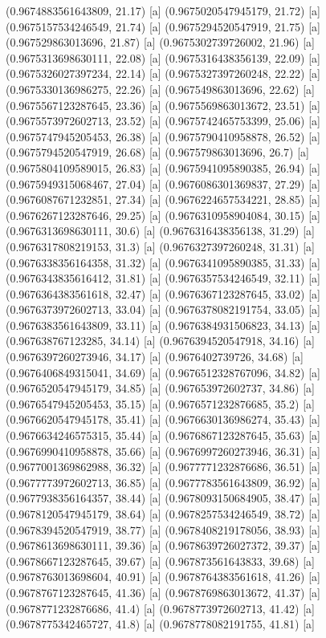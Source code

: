 {{{(0.9674883561643809, 21.17) [a] 
(0.9675020547945179, 21.72) [a] 
(0.9675157534246549, 21.74) [a] 
(0.9675294520547919, 21.75) [a] 
(0.967529863013696, 21.87) [a] 
(0.9675302739726002, 21.96) [a] 
(0.9675313698630111, 22.08) [a] 
(0.9675316438356139, 22.09) [a] 
(0.9675326027397234, 22.14) [a] 
(0.9675327397260248, 22.22) [a] 
(0.9675330136986275, 22.26) [a] 
(0.967549863013696, 22.62) [a] 
(0.9675567123287645, 23.36) [a] 
(0.9675569863013672, 23.51) [a] 
(0.9675573972602713, 23.52) [a] 
(0.9675742465753399, 25.06) [a] 
(0.9675747945205453, 26.38) [a] 
(0.9675790410958878, 26.52) [a] 
(0.9675794520547919, 26.68) [a] 
(0.967579863013696, 26.7) [a] 
(0.9675804109589015, 26.83) [a] 
(0.9675941095890385, 26.94) [a] 
(0.9675949315068467, 27.04) [a] 
(0.9676086301369837, 27.29) [a] 
(0.9676087671232851, 27.34) [a] 
(0.9676224657534221, 28.85) [a] 
(0.9676267123287646, 29.25) [a] 
(0.9676310958904084, 30.15) [a] 
(0.9676313698630111, 30.6) [a] 
(0.9676316438356138, 31.29) [a] 
(0.9676317808219153, 31.3) [a] 
(0.9676327397260248, 31.31) [a] 
(0.9676338356164358, 31.32) [a] 
(0.9676341095890385, 31.33) [a] 
(0.9676343835616412, 31.81) [a] 
(0.9676357534246549, 32.11) [a] 
(0.9676364383561618, 32.47) [a] 
(0.9676367123287645, 33.02) [a] 
(0.9676373972602713, 33.04) [a] 
(0.9676378082191754, 33.05) [a] 
(0.9676383561643809, 33.11) [a] 
(0.9676384931506823, 34.13) [a] 
(0.967638767123285, 34.14) [a] 
(0.9676394520547918, 34.16) [a] 
(0.9676397260273946, 34.17) [a] 
(0.9676402739726, 34.68) [a] 
(0.9676406849315041, 34.69) [a] 
(0.9676512328767096, 34.82) [a] 
(0.9676520547945179, 34.85) [a] 
(0.967653972602737, 34.86) [a] 
(0.9676547945205453, 35.15) [a] 
(0.9676571232876685, 35.2) [a] 
(0.9676620547945178, 35.41) [a] 
(0.9676630136986274, 35.43) [a] 
(0.9676634246575315, 35.44) [a] 
(0.9676867123287645, 35.63) [a] 
(0.9676990410958878, 35.66) [a] 
(0.9676997260273946, 36.31) [a] 
(0.9677001369862988, 36.32) [a] 
(0.9677771232876686, 36.51) [a] 
(0.9677773972602713, 36.85) [a] 
(0.9677783561643809, 36.92) [a] 
(0.9677938356164357, 38.44) [a] 
(0.9678093150684905, 38.47) [a] 
(0.9678120547945179, 38.64) [a] 
(0.9678257534246549, 38.72) [a] 
(0.9678394520547919, 38.77) [a] 
(0.9678408219178056, 38.93) [a] 
(0.9678613698630111, 39.36) [a] 
(0.9678639726027372, 39.37) [a] 
(0.9678667123287645, 39.67) [a] 
(0.967873561643833, 39.68) [a] 
(0.9678763013698604, 40.91) [a] 
(0.9678764383561618, 41.26) [a] 
(0.9678767123287645, 41.36) [a] 
(0.9678769863013672, 41.37) [a] 
(0.9678771232876686, 41.4) [a] 
(0.9678773972602713, 41.42) [a] 
(0.9678775342465727, 41.8) [a] 
(0.9678778082191755, 41.81) [a] 
}}}
